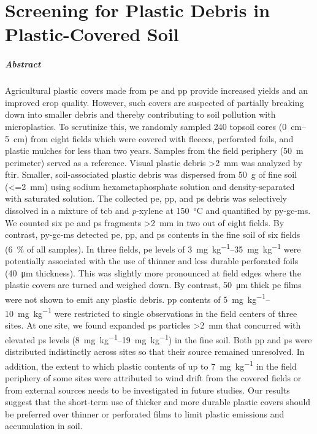
\chapter{Screening for Plastic Debris in Plastic-Covered Soil}
\label{ch:screening}

\paragraph{Abstract}
Agricultural plastic covers made from \ac{pe} and \ac{pp} provide increased yields and an improved crop quality. However, such covers are suspected of partially breaking down into smaller debris and thereby contributing to soil pollution with microplastics. To scrutinize this, we randomly sampled 240 topsoil cores (\SIrange{0}{5}{\centi\meter}) from eight fields which were covered with fleeces, perforated foils, and plastic mulches for less than two years. Samples from the field periphery (\SI{50}{\meter} perimeter) served as a reference. Visual plastic debris \SI{>2}{\milli\meter} was analyzed by \ac{ftir}. Smaller, soil-associated plastic debris was dispersed from \SI{50}{\gram} of fine soil (\SI{<=2}{\milli\meter}) using sodium hexametaphosphate solution and density-separated with saturated  solution. The collected \ac{pe}, \ac{pp}, and \ac{ps} debris was selectively dissolved in a mixture of \ac{tcb} and \textit{p}-xylene at \SI{150}{\degreeCelsius} and quantified by \ac{py-gc-ms}. We counted six \ac{pe} and \ac{ps} fragments \SI{>2}{\milli\meter} in two out of eight fields. By contrast, \ac{py-gc-ms} detected \ac{pe}, \ac{pp}, and \ac{ps} contents in the fine soil of six fields (\SI{6}{\percent} of all samples). In three fields, \ac{pe} levels of \SIrange{3}{35}{\milli\gram\per\kilo\gram} were potentially associated with the use of thinner and less durable perforated foils (\SI{40}{\micro\meter} thickness). This was slightly more pronounced at field edges where the plastic covers are turned and weighed down. By contrast, \SI{50}{\micro\meter} thick \ac{pe} films were not shown to emit any plastic debris. \ac{pp} contents of \SIrange{5}{10}{\milli\gram\per\kilo\gram} were restricted to single observations in the field centers of three sites. At one site, we found expanded \ac{ps} particles \SI{>2}{\milli\meter} that concurred with elevated \ac{ps} levels (\SIrange{8}{19}{\milli\gram\per\kilo\gram}) in the fine soil. Both \ac{pp} and \ac{ps} were distributed indistinctly across sites so that their source remained unresolved. In addition, the extent to which plastic contents of up to \SI{7}{\milli\gram\per\kilo\gram} in the field periphery of some sites were attributed to wind drift from the covered fields or from external sources needs to be investigated in future studies. Our results suggest that the short-term use of thicker and more durable plastic covers should be preferred over thinner or perforated films to limit plastic emissions and accumulation in soil.

